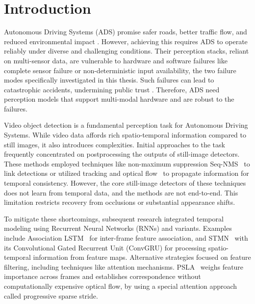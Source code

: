 \section{Introduction} \label{Introduction}


Autonomous Driving Systems (ADS) promise safer roads, better traffic flow, and reduced environmental impact \cite{litmanAutonomousVehicleImplementationb}. However, achieving this requires ADS to operate reliably under diverse and challenging conditions. Their perception stacks, reliant on multi-sensor data, are vulnerable to hardware and software failures like complete sensor failure or non-deterministic input availability, the two failure modes specifically investigated in this thesis. Such failures can lead to catastrophic accidents, undermining public trust \cite{yurtseverSurveyAutonomousDriving2020}. Therefore, ADS need perception models that support multi-modal hardware and are robust to the failures.

Video object detection is a fundamental perception task for Autonomous Driving Systems. While video data affords rich spatio-temporal information compared to still images, it also introduces complexities. Initial approaches to the task frequently concentrated on postprocessing the outputs of still-image detectors. These methods employed techniques like non-maximum suppression Seq-NMS~\cite{hanSeqNMSVideoObject2016} to link detections or utilized tracking and optical flow~\cite{kangObjectDetectionVideo2016, kangTCNNTubeletsConvolutional2018} to propagate information for temporal consistency. However, the core still-image detectors of these techniques does not learn from temporal data, and the methods are not end-to-end. This limitation restricts recovery from occlusions or substantial appearance shifts.

To mitigate these shortcomings, subsequent research integrated temporal modeling using Recurrent Neural Networks (RNNs) and variants. Examples include Association LSTM~\cite{Lu_2017_ICCV} for inter-frame feature association, and STMN~\cite{xiaoVideoObjectDetection2018} with its Convolutional Gated Recurrent Unit (ConvGRU) for processing spatio-temporal information from feature maps. Alternative strategies focused on feature filtering, including techniques like attention mechanisms. PSLA~\cite{guoProgressiveSparseLocal2019} weighs feature importance across frames and establishes correspondence without computationally expensive optical flow, by using a special attention approach called progressive sparse stride.

